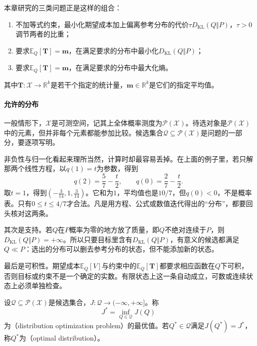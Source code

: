 本章研究的三类问题正是这样的组合：
\begin{enumerate}
 \item 不加等式约束，最小化期望成本加上偏离参考分布的代价$\tau D_{\mathrm{KL}}(Q\Vert P)$，$\tau>0$调节两者的比重；
 \item 要求$\mathbb{E}_{Q}[\bm{T}]=\bm{m}$，在满足要求的分布中最小化$D_{\mathrm{KL}}(Q\Vert P)$；
 \item 要求$\mathbb{E}_{Q}[\bm{T}]=\bm{m}$，在满足要求的分布中最大化熵。
\end{enumerate}
其中$\bm{T}:\mathcal{X}\to\mathbb{R}^{k}$是若干个指定的统计量，$\bm{m}\in\mathbb{R}^{k}$是它们的指定平均值。

\paragraph{允许的分布}
一般情形下，$\mathcal{X}$是可测空间，记其上全体概率测度为$\mathcal{P}(\mathcal{X})$。待选对象是$\mathcal{P}(\mathcal{X})$中的元素，但并非每个元素都能参加比较。候选集合$\mathcal{Q}\subseteq\mathcal{P}(\mathcal{X})$是问题的一部分，要逐项写明。

非负性与归一化看起来理所当然，计算时却最容易丢掉。在上面的例子里，若只解那两个线性方程，以$q(1)=t$为参数，得到
\[
 q(2)=\frac57-\frac t2,\qquad q(0)=\frac27-\frac t2 .
\]
取$t=1$，得到$(-\tfrac{3}{14},1,\tfrac{3}{14})$。它和为$1$，平均值也是$10/7$，但$q(0)<0$，不是概率表。只有$0\leq t\leq4/7$才合法。凡是用方程、公式或数值迭代得出的“分布”，都要回头核对这两条。

其次是支持。若$Q$在$P$概率为零的地方放了质量，即$Q$不绝对连续于$P$，则$D_{\mathrm{KL}}(Q\Vert P)=+\infty$。所以只要目标里含有$D_{\mathrm{KL}}(Q\Vert P)$，有意义的候选都满足$Q\ll P$：选出的分布可以删去参考分布的状态，但不能添加新的状态。

最后是可积性。期望成本$\mathbb{E}_{Q}[V]$与约束中的$\mathbb{E}_{Q}[\bm{T}]$都要求相应函数在$Q$下可积，否则目标或约束不是一个确定的实数。有限状态上这一条自动成立，可数或连续状态上必须单独检查。

\begin{definition}[分布优化问题]
\label{def:dsel-problem}
设$\mathcal{Q}\subseteq\mathcal{P}(\mathcal{X})$是候选集合，$J:\mathcal{Q}\to(-\infty,+\infty]$。称
\begin{equation}
 J^{*}=\inf_{Q\in\mathcal{Q}}J(Q)
 \label{eq:dsel-problem}
\end{equation}
为（distribution optimization problem）的最优值。若$Q^{*}\in\mathcal{Q}$满足$J(Q^{*})=J^{*}$，称$Q^{*}$为（optimal distribution）。
\end{definition}

